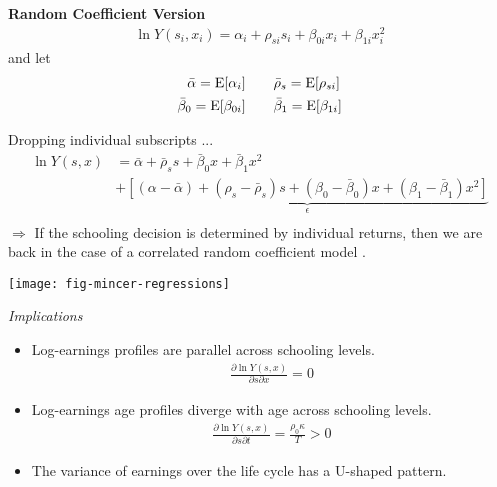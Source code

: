 \begin{frame}
\textbf{Random Coefficient Version}
\begin{align*}
\ln Y(s_i, x_i) = \alpha_{i} + \rho_{si} s_i + \beta_{0i} x_i + \beta_{1i} x_i^2
\end{align*}
and let
\begin{align*}
\bar{\alpha} = \mathrm{E}[\alpha_i] &\qquad \bar{\rho}_s = \mathrm{E}[\rho_{si}]\\
\bar{\beta}_0 = \mathrm{E}[\beta_{0i}]&\qquad \bar{\beta}_1 = \mathrm{E}[\beta_{1i}]
\end{align*}
\end{frame}


\begin{frame}
Dropping individual subscripts ...
\begin{align*}
\ln Y(s, x) & = \bar{\alpha} + \bar{\rho}_s s + \bar{\beta}_{0} x + \bar{\beta}_{1} x^2 \\
                & + \underbrace{[(\alpha - \bar{\alpha}) + (\rho_s - \bar{\rho}_s) s + (\beta_0 - \bar{\beta}_0)x + (\beta_1 - \bar{\beta}_1)x^2 ]}_{\epsilon}\\
\end{align*}
$\Rightarrow$ If the schooling decision is determined by individual returns, then we are back in the case of a correlated random coefficient model \citep{Heckman.2006d}.
\end{frame}



\begin{frame}[plain]

\begin{center}
\texttt{[image: fig-mincer-regressions]}
\end{center}

\end{frame}

\begin{frame}\begin{center}
\LARGE\textit{Implications}
\end{center}\end{frame}



\begin{frame}
\begin{itemize}
\item Log-earnings profiles are parallel across schooling levels.
\begin{align*}
\frac{\partial \ln Y(s, x)}{\partial s \partial x} = 0
\end{align*}
\item Log-earnings age profiles diverge with age across schooling levels.
\begin{align*}
\frac{\partial \ln Y(s, x)}{\partial s \partial t} = \frac{\rho_0\kappa}{T} > 0
\end{align*}
\item The variance of earnings over the life cycle has a U-shaped pattern.
\end{itemize}
\end{frame}


